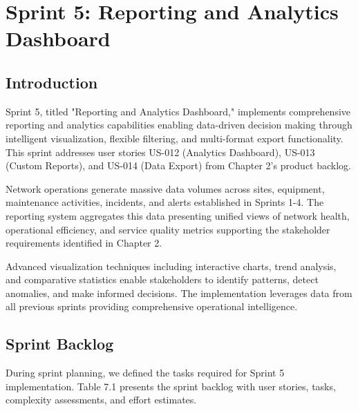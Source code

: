 \newpage

\chapter{Sprint 5: Reporting and Analytics Dashboard}

\cfoot{\thepage}

\parindent=0.5in
\onehalfspacing

\section{Introduction}

Sprint 5, titled "Reporting and Analytics Dashboard," implements comprehensive reporting and analytics capabilities enabling data-driven decision making through intelligent visualization, flexible filtering, and multi-format export functionality. This sprint addresses user stories US-012 (Analytics Dashboard), US-013 (Custom Reports), and US-014 (Data Export) from Chapter 2's product backlog.

Network operations generate massive data volumes across sites, equipment, maintenance activities, incidents, and alerts established in Sprints 1-4. The reporting system aggregates this data presenting unified views of network health, operational efficiency, and service quality metrics supporting the stakeholder requirements identified in Chapter 2.

Advanced visualization techniques including interactive charts, trend analysis, and comparative statistics enable stakeholders to identify patterns, detect anomalies, and make informed decisions. The implementation leverages data from all previous sprints providing comprehensive operational intelligence.

\section{Sprint Backlog}

During sprint planning, we defined the tasks required for Sprint 5 implementation. Table 7.1 presents the sprint backlog with user stories, tasks, complexity assessments, and effort estimates.

